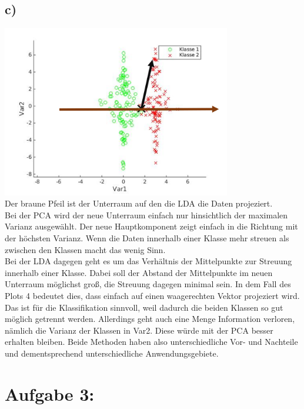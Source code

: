 \documentclass[a4paper]{scrartcl}
\newcounter{punkte}
\begin{document}
\subsection*{c)}
\includegraphics[width=10cm]{assignment4_data/plots/A2c_bild4.png}\\
Der braune Pfeil ist der Unterraum auf den die LDA die Daten projeziert.\\
Bei der PCA wird der neue Unterraum einfach nur hinsichtlich der maximalen Varianz ausgewählt. Der neue Hauptkomponent zeigt einfach in die Richtung mit der höchsten Varianz. Wenn die Daten innerhalb einer Klasse mehr streuen als zwischen den Klassen macht das wenig Sinn.\\
Bei der LDA dagegen geht es um das Verhältnis der Mittelpunkte zur Streuung innerhalb einer Klasse. Dabei soll der Abstand der Mittelpunkte im neuen Unterraum möglichst groß, die Streuung dagegen minimal sein. In dem Fall des Plots 4 bedeutet dies, dass einfach auf einen waagerechten Vektor projeziert wird.\\
Das ist für die Klassifikation sinnvoll, weil dadurch die beiden Klassen so gut möglich getrennt werden. Allerdings geht auch eine Menge Information verloren, nämlich die Varianz der Klassen in Var2. Diese würde mit der PCA besser erhalten bleiben. Beide Methoden haben also unterschiedliche Vor- und Nachteile und dementsprechend unterschiedliche Anwendungsgebiete.

\section*{Aufgabe 3:}
\end{document}
